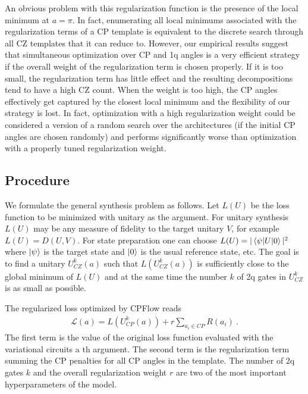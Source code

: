 \documentclass[twocolumn, amsfonts, amssymb, aps, nofootinbib]{revtex4-2}
\newcommand{\CZ}{\textsf{CZ }}
\newcommand{\CP}{\textsf{CP }}
\begin{document}
An obvious problem with this regularization function is the presence of the local minimum at $a=\pi$. In fact, enumerating all local minimums associated with the regularization terms of a \CP template is equivalent to the discrete search through all \CZ templates that it can reduce to. However, our empirical results suggest that simultaneous optimization over \CP and 1q angles is a very efficient strategy if the overall weight of the regularization term is chosen properly. If it is too small, the regularization term has little effect and the resulting decompositions tend to have a high \CZ count. When the weight is too high, the \CP angles effectively get captured by the closest local minimum and the flexibility of our strategy is lost. In fact, optimization with a high regularization weight could be considered a version of a random search over the architectures (if the initial \CP angles are chosen randomly) and performs significantly worse than optimization with a properly tuned regularization weight.

\subsection{Procedure}

We formulate the general synthesis problem as follows. Let $L(U)$ be the loss function to be minimized with unitary as the argument. For unitary synthesis $L(U)$ may be any measure of fidelity to the target unitary $V$, for example $L(U)=D(U, V)$. For state preparation one can choose $L(U) = |\braket{\psi|U|0}|^2$ where $\ket{\psi}$ is the target state and $\ket{0}$ is the usual reference state, etc. The goal is to find a unitary $U^k_{CZ}(a)$ such that $L(U^k_{CZ}(a))$ is sufficiently close to the global minimum of $L(U)$ and at the same time the number $k$ of 2q gates in $U^k_{CZ}$ is as small as possible.

The regularized loss optimized by CPFlow reads
\begin{align}
\mathcal{L}(a)=L(U^k_{CP}(a))+r\sum_{a_i\in CP} R(a_i) \ . \label{CP loss}
\end{align}
The first term is the value of the original loss function evaluated with the variational circuits a th argument. The second term is the regularization term summing the \CP penalties for all \CP angles in the template. The number of 2q gates $k$ and the overall regularization weight $r$ are two of the most important hyperparameters of the model.
\end{document}
